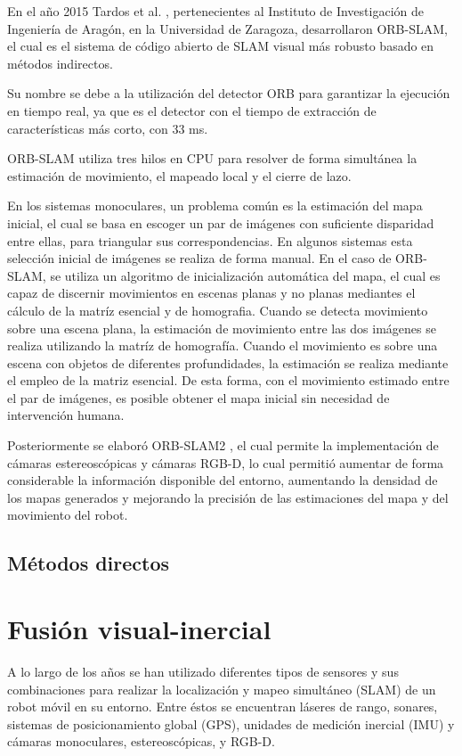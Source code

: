 En el año 2015 Tardos et al. \cite{orbSlam}, pertenecientes al Instituto de Investigación de Ingeniería de Aragón, en la Universidad de Zaragoza,  desarrollaron ORB-SLAM, el cual es el sistema de código abierto de SLAM visual más robusto basado en métodos indirectos.

Su nombre se debe a la utilización del detector ORB para garantizar la ejecución en tiempo real, ya que es el detector con el tiempo de extracción de características más corto, con 33 ms.

ORB-SLAM utiliza tres hilos en CPU para resolver de forma simultánea la estimación de movimiento, el mapeado local y el cierre de lazo.

En los sistemas monoculares, un problema común es la estimación del mapa inicial, el cual se basa en escoger un par de imágenes con suficiente disparidad entre ellas, para triangular sus correspondencias. En algunos sistemas esta selección inicial de imágenes se realiza de forma manual. En el caso de ORB-SLAM, se utiliza un algoritmo de inicialización automática del mapa, el cual es capaz de discernir movimientos en escenas planas y no planas mediantes el cálculo de la matríz esencial y de homografia. Cuando se detecta movimiento sobre una escena plana, la estimación de movimiento entre las dos imágenes se realiza utilizando la matríz de homografía. Cuando el movimiento es sobre una escena con objetos de diferentes profundidades, la estimación se realiza mediante el empleo de la matriz esencial.  De esta forma, con el movimiento estimado entre el par de imágenes, es posible obtener el mapa inicial sin necesidad de intervención humana.

Posteriormente se elaboró ORB-SLAM2 \cite{orbSlam2}, el cual permite la implementación de cámaras estereoscópicas y cámaras RGB-D,
lo cual permitió aumentar de forma considerable la información disponible del entorno, aumentando la densidad de los mapas generados y mejorando la precisión de las estimaciones del mapa y del movimiento del robot.


\subsection{Métodos directos}


\section{Fusión visual-inercial }
A lo largo de los años se han utilizado diferentes tipos de sensores y sus combinaciones para realizar la localización y mapeo simultáneo (SLAM) de un robot móvil en su entorno. Entre éstos se encuentran láseres de rango, sonares, sistemas de posicionamiento global (GPS), unidades de medición inercial (IMU) y cámaras monoculares, estereoscópicas, y RGB-D.\\

